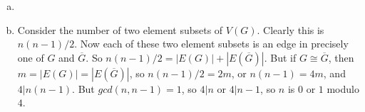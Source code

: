 \begin{enumerate}[(a)]
	\item
	\item Consider the number of two element subsets of $V(G)$. Clearly this
		is $n(n-1)/2$. Now each of these two element subsets is an edge in precisely
		one of $G$ and $\overline{G}$. So $n(n-1)/2=|E(G)|+|E(\overline{G})|$.
	But if $G \cong \overline{G}$, then $m=|E(G)|=|E(\overline{G})|$, so
	$n(n-1)/2=2m$, or $n(n-1)=4m$, and $4|n(n-1)$. But $gcd(n,n-1)=1$, so $4|n$ or
	$4|n-1$, so $n$ is $0$ or $1$ modulo $4$.
\end{enumerate}
